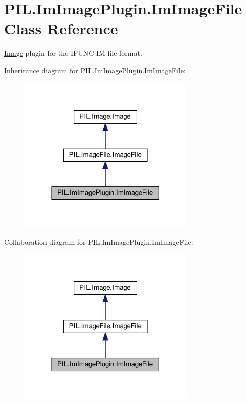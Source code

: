 \hypertarget{classPIL_1_1ImImagePlugin_1_1ImImageFile}{}\section{P\+I\+L.\+Im\+Image\+Plugin.\+Im\+Image\+File Class Reference}
\label{classPIL_1_1ImImagePlugin_1_1ImImageFile}


\hyperlink{namespacePIL_1_1Image}{Image} plugin for the I\+F\+U\+NC IM file format.  




Inheritance diagram for P\+I\+L.\+Im\+Image\+Plugin.\+Im\+Image\+File\+:
\nopagebreak
\begin{figure}[H]
\begin{center}
\leavevmode
\includegraphics[width=237pt]{classPIL_1_1ImImagePlugin_1_1ImImageFile__inherit__graph}
\end{center}
\end{figure}


Collaboration diagram for P\+I\+L.\+Im\+Image\+Plugin.\+Im\+Image\+File\+:
\nopagebreak
\begin{figure}[H]
\begin{center}
\leavevmode
\includegraphics[width=237pt]{classPIL_1_1ImImagePlugin_1_1ImImageFile__coll__graph}
\end{center}
\end{figure}
